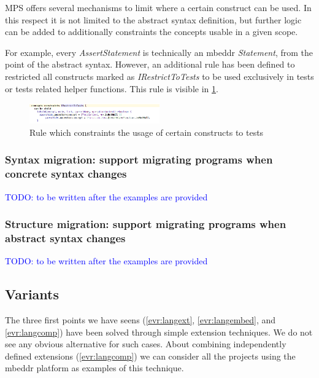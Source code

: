 \documentclass[preprint,numbers,10pt]{sigplanconf}
\newcommand\comment[1]{\textcolor{blue}{#1}}
\begin{document}
MPS offers several mechanisms to limit where a certain construct can be used. In this respect it is not limited to the abstract syntax definition, but further logic can be added to additionally constraints the concepts usable in a given scope.

For example, every \emph{AssertStatement} is technically an mbeddr \emph{Statement}, from the point of the abstract syntax. However, an additional rule has been defined to restricted all constructs marked as \emph{IRestrictToTests} to be used exclusively in tests or tests related helper functions. This rule is visible in \ref{fig:restrictedtotest}.

\begin{figure}[p]
	\centering
	\includegraphics[width=0.50\textwidth]{screens/restricted_to_test.png}
	\caption{Rule which constraints the usage of certain constructs to tests}
	\label{fig:restrictedtotest}
\end{figure}

\subsubsection{Syntax migration: support migrating programs when concrete syntax changes}
\label{evr:synmigr}

\comment{TODO: to be written after the examples are provided}

\subsubsection{Structure migration: support migrating programs when abstract syntax changes}
\label{evr:structmigr}

\comment{TODO: to be written after the examples are provided}

\subsection{Variants}

The three first points we have seens (\ref{evr:langext}, \ref{evr:langembed}, and \ref{evr:langcomp}) have been solved through simple extension techniques. We do not see any obvious alternative for such cases. About combining independently defined extensions (\ref{evr:langcomp}) we can consider all the projects using the mbeddr platform as examples of this technique.
\end{document}
